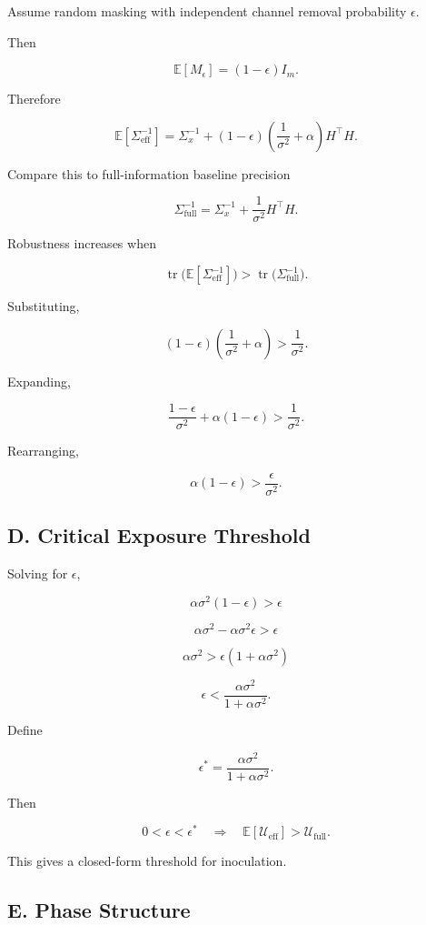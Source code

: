 \documentclass[11pt]{article}
\theoremstyle{remark}
\begin{document}
Assume random masking with independent channel removal probability $\epsilon$.

Then

\[
\mathbb{E}[M_\epsilon] = (1-\epsilon) I_m.
\]

Therefore

\[
\mathbb{E}[\Sigma_{\text{eff}}^{-1}]
=
\Sigma_x^{-1}
+
(1-\epsilon)
\left(
\frac{1}{\sigma^2} + \alpha
\right)
H^\top H.
\]

Compare this to full-information baseline precision

\[
\Sigma_{\text{full}}^{-1}
=
\Sigma_x^{-1}
+
\frac{1}{\sigma^2} H^\top H.
\]

Robustness increases when

\[
\operatorname{tr}\big(\mathbb{E}[\Sigma_{\text{eff}}^{-1}]\big)
>
\operatorname{tr}\big(\Sigma_{\text{full}}^{-1}\big).
\]

Substituting,

\[
(1-\epsilon)
\left(
\frac{1}{\sigma^2} + \alpha
\right)
>
\frac{1}{\sigma^2}.
\]

Expanding,

\[
\frac{1-\epsilon}{\sigma^2}
+
\alpha (1-\epsilon)
>
\frac{1}{\sigma^2}.
\]

Rearranging,

\[
\alpha(1-\epsilon)
>
\frac{\epsilon}{\sigma^2}.
\]

\subsection*{D. Critical Exposure Threshold}

Solving for $\epsilon$,

\[
\alpha \sigma^2 (1-\epsilon) > \epsilon
\]

\[
\alpha \sigma^2 - \alpha \sigma^2 \epsilon > \epsilon
\]

\[
\alpha \sigma^2 > \epsilon(1 + \alpha \sigma^2)
\]

\[
\epsilon < \frac{\alpha \sigma^2}{1 + \alpha \sigma^2}.
\]

Define

\[
\epsilon^*
=
\frac{\alpha \sigma^2}{1 + \alpha \sigma^2}.
\]

Then

\[
0 < \epsilon < \epsilon^*
\quad \Longrightarrow \quad
\mathbb{E}[\mathcal{U}_{\text{eff}}] >
\mathcal{U}_{\text{full}}.
\]

This gives a closed-form threshold for inoculation.

\subsection*{E. Phase Structure}
\end{document}
